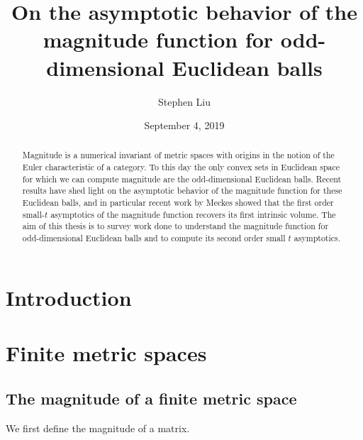 \documentclass[11pt]{article}
\theoremstyle{definition}
\theoremstyle{definition}
\theoremstyle{plain}
\theoremstyle{plain}
\theoremstyle{plain}
\theoremstyle{definition}
\begin{document}
\author{Stephen Liu}
\title{On the asymptotic behavior of the magnitude function for odd-dimensional Euclidean balls}
\date{September 4, 2019}

\maketitle

\begin{abstract}
Magnitude is a numerical invariant of metric spaces with origins in the notion of the Euler characteristic of a category. To this day the only convex sets in Euclidean space for which we can compute magnitude are the odd-dimensional Euclidean balls. Recent results have shed light on the asymptotic behavior of the magnitude function for these Euclidean balls, and in particular recent work by Meckes showed that the first order small-$t$ asymptotics of the magnitude function recovers its first intrinsic volume. The aim of this thesis is to survey work done to understand the magnitude function for odd-dimensional Euclidean balls and to compute its second order small $t$ asymptotics.
\end{abstract}

\tableofcontents
\newpage

\section{Introduction}

\section{Finite metric spaces}

\subsection{The magnitude of a finite metric space}

We first define the magnitude of a matrix.
\end{document}
